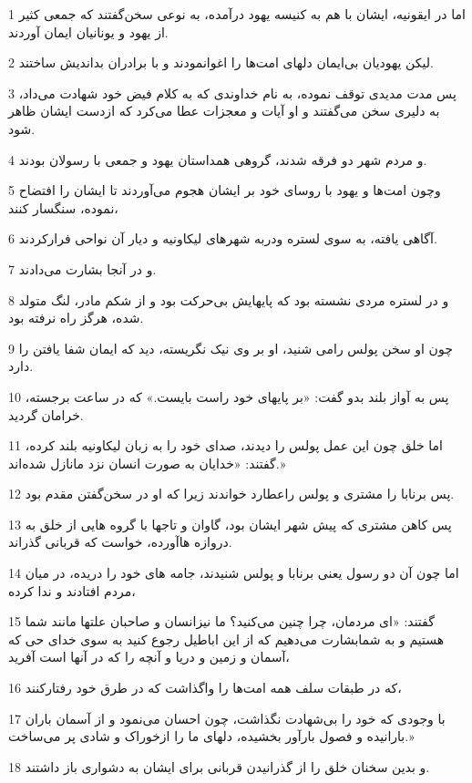 \par 1 اما در ایقونیه، ایشان با هم به کنیسه یهود در‌آمده، به نوعی سخن‌گفتند که جمعی کثیر از یهود و یونانیان ایمان آوردند.
\par 2 لیکن یهودیان بی‌ایمان دلهای امت‌ها را اغوانمودند و با برادران بداندیش ساختند.
\par 3 پس مدت مدیدی توقف نموده، به نام خداوندی که به کلام فیض خود شهادت می‌داد، به دلیری سخن می‌گفتند و او آیات و معجزات عطا می‌کرد که ازدست ایشان ظاهر شود.
\par 4 و مردم شهر دو فرقه شدند، گروهی همداستان یهود و جمعی با رسولان بودند.
\par 5 وچون امت‌ها و یهود با روسای خود بر ایشان هجوم می‌آوردند تا ایشان را افتضاح نموده، سنگسار کنند،
\par 6 آگاهی یافته، به سوی لستره ودربه شهرهای لیکاونیه و دیار آن نواحی فرارکردند.
\par 7 و در آنجا بشارت می‌دادند.
\par 8 و در لستره مردی نشسته بود که پایهایش بی‌حرکت بود و از شکم مادر، لنگ متولد شده، هرگز راه نرفته بود.
\par 9 چون او سخن پولس رامی شنید، او بر وی نیک نگریسته، دید که ایمان شفا یافتن را دارد.
\par 10 پس به آواز بلند بدو گفت: «بر پایهای خود راست بایست.» که در ساعت برجسته، خرامان گردید.
\par 11 اما خلق چون این عمل پولس را دیدند، صدای خود را به زبان لیکاونیه بلند کرده، گفتند: «خدایان به صورت انسان نزد مانازل شده‌اند.»
\par 12 پس برنابا را مشتری و پولس راعطارد خواندند زیرا که او در سخن‌گفتن مقدم بود.
\par 13 پس کاهن مشتری که پیش شهر ایشان بود، گاوان و تاجها با گروه هایی از خلق به دروازه هاآورده، خواست که قربانی گذراند.
\par 14 اما چون آن دو رسول یعنی برنابا و پولس شنیدند، جامه های خود را دریده، در میان مردم افتادند و ندا کرده،
\par 15 گفتند: «ای مردمان، چرا چنین می‌کنید؟ ما نیزانسان و صاحبان علتها مانند شما هستیم و به شمابشارت می‌دهیم که از این اباطیل رجوع کنید به سوی خدای حی که آسمان و زمین و دریا و آنچه را که در آنها است آفرید،
\par 16 که در طبقات سلف همه امت‌ها را واگذاشت که در طرق خود رفتارکنند،
\par 17 با وجودی که خود را بی‌شهادت نگذاشت، چون احسان می‌نمود و از آسمان باران بارانیده و فصول بارآور بخشیده، دلهای ما را ازخوراک و شادی پر می‌ساخت.»
\par 18 و بدین سخنان خلق را از گذرانیدن قربانی برای ایشان به دشواری باز داشتند.
